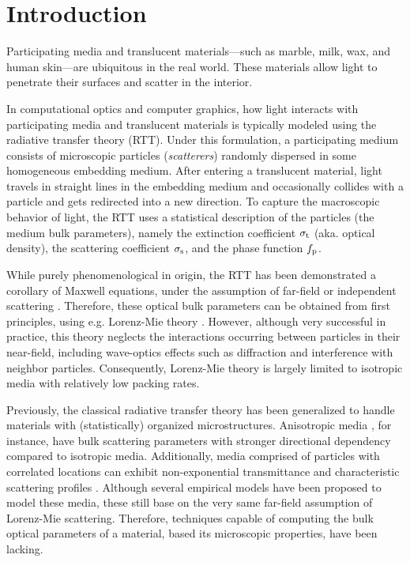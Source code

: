 \section{Introduction}
\label{sec:waveoptics:intro}

Participating media and translucent materials---such as marble, milk, wax, and human skin---are ubiquitous in the real world. These materials allow light to penetrate their surfaces and scatter in the interior. 

In computational optics and computer graphics, how light interacts with participating media and translucent materials is typically modeled using the radiative transfer theory (RTT). Under this formulation, a participating medium consists of microscopic particles (\emph{scatterers}) randomly dispersed in some homogeneous embedding medium. After entering a translucent material, light travels in straight lines in the embedding medium and occasionally collides with a particle and gets redirected into a new direction. To capture the macroscopic behavior of light, the RTT uses a statistical description of the particles (the medium bulk parameters), namely the extinction coefficient $\sigma_\mathrm{t}$ (aka. optical density), the scattering coefficient $\sigma_\mathrm{s}$, and the phase function $f_\mathrm{p}$.

While purely phenomenological in origin, the RTT has been demonstrated a corollary of Maxwell equations, under the assumption of far-field or independent scattering \cite{mishchenko2002vector}. Therefore, these optical bulk parameters can be obtained from first principles, using e.g. Lorenz-Mie theory \cite{hulst1981light,frisvad2007computing}. However, although very successful in practice, this theory neglects the interactions occurring between particles in their near-field, including wave-optics effects such as diffraction and interference with neighbor particles. Consequently, Lorenz-Mie theory is largely limited to isotropic media with relatively low packing rates.


Previously, the classical radiative transfer theory has been generalized to handle materials with (statistically) organized microstructures. 
Anisotropic media \cite{jakob2010radiative}, for instance, have bulk scattering parameters with stronger directional dependency compared to isotropic media.
Additionally, media comprised of particles with correlated locations can exhibit non-exponential transmittance and characteristic scattering profiles \cite{bitterli2018radiative,jarabo2018radiative}.
Although several empirical models have been proposed to model these media, these still base on the very same far-field assumption of Lorenz-Mie scattering. Therefore, techniques capable of computing the bulk optical parameters of a material, based its microscopic properties, have been lacking.

